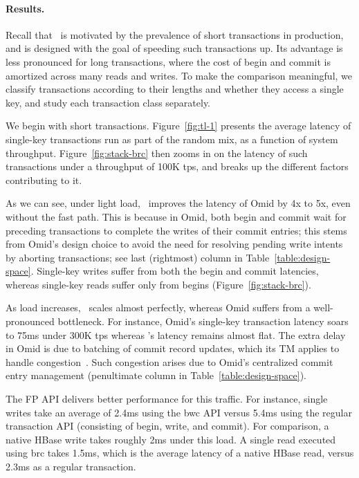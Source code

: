 \paragraph{Results.} 

Recall that \sys\ is motivated by the prevalence of short transactions in production, and is designed with
the goal of speeding such transactions up.
Its advantage is less pronounced for long transactions, where the cost of begin and commit is amortized
across many reads and writes.
To make the comparison meaningful, we classify transactions according to their lengths and whether they
access a single key, and study each transaction class separately. 

We begin with short transactions. 
Figure~\ref{fig:tl-1} presents the average latency of single-key transactions run as part of the random mix,
as a function of {system} throughput.
Figure~\ref{fig:stack-brc}  then zooms in on the latency of such transactions under 
a throughput of 100K tps, and breaks up the different factors contributing to it. 

As we can see, under light load, \sys\ improves the latency of Omid by 4x to 5x, even without the fast path.
This is because in Omid, both begin and commit wait for preceding transactions to complete the writes of 
their commit entries; this stems from Omid's design choice to avoid the need for resolving pending write intents
by aborting transactions; see last (rightmost) column in Table~\ref{table:design-space}. 
Single-key writes suffer from both the begin and commit latencies, whereas single-key reads  
suffer only from begins (Figure~\ref{fig:stack-brc}). 

As load increases, \sys\ scales almost perfectly, whereas Omid suffers from a well-pronounced 
bottleneck. For instance, Omid's single-key transaction latency soars to 75ms under 300K tps whereas
{\sys}'s latency remains almost flat. The extra delay in Omid is due to batching of commit record updates, 
which its TM applies to handle congestion~\cite{Omid2017}. Such congestion arises due to Omid's centralized 
commit entry management (penultimate column in Table~\ref{table:design-space}).

The FP API delivers better performance for this traffic. For instance, single writes take an average of 2.4ms using 
the {\code bwc} API versus 5.4ms using the regular transaction API (consisting of begin, write, and commit). 
For comparison, a native HBase write takes roughly 2ms under this load.
A single read executed using {\code brc} takes 1.5ms, which is the average latency of a native HBase read,
versus 2.3ms as a regular transaction. 

